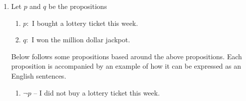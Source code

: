 \documentclass[fleqn]{article}
\begin{document}
\begin{enumerate}[label=\textbf{\arabic*}]
  \item
  Let $ p $ and $ q $ be the propositions
  
  \begin{enumerate}[label={}]
  \item
  $ p : $ I bought a lottery ticket this week.
  \item  
  $ q : $ I won the million dollar jackpot.
  \end{enumerate}
  
  Below follows some propositions based around the above propositions. Each proposition is accompanied  by an example of how it can be expressed as an English sentences.
  \begin{enumerate}[label = \textbf{\alph*)}]
  \item  
  $\neg p$ -- I did not buy a lottery ticket this week.  
  \end{enumerate}
\end{enumerate}
  
\end{document}
